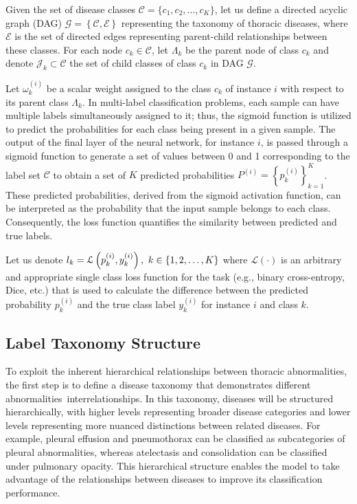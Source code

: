 Given the set of disease classes $\mathcal{C} = \{c_1,c_2,\dots,c_K\} $, let us define a directed acyclic graph (DAG) $\mathcal{G}=\left\{\mathcal{C},\mathcal{E}\right\} $ representing the taxonomy of thoracic diseases, where $\mathcal{E}$ is the set of directed edges representing parent-child relationships between these classes. For each node $c_k \in \mathcal{C} $, let $\Lambda_k$ be the parent node of class $c_k $ and denote $\mathcal{J}_k\subset \mathcal{C} $ the set of child classes of class $c_k $ in DAG $\mathcal{G}$.

Let $\omega_k^{(i)} $ be a scalar weight assigned to the class $c_k $ of instance $i $ with respect to its parent class $\Lambda_k$. In multi-label classification problems, each sample can have multiple labels simultaneously assigned to it; thus, the sigmoid function is utilized to predict the probabilities for each class being present in a given sample. The output of the final layer of the neural network, for instance $i $, is passed through a sigmoid function to generate a set of values between 0 and 1 corresponding to the label set $\mathcal{C} $ to obtain a set of $K $ predicted probabilities $P^{(i)}={\left\{p_k^{(i)}\right\}}_{k=1}^{K} $. These predicted probabilities, derived from the sigmoid activation function, can be interpreted as the probability that the input sample belongs to each class. Consequently, the loss function quantifies the similarity between predicted and true labels.

Let us denote $l_k = \mathcal{L} \left(p_k^{(i)},y_k^{(i)}\right),\hspace{0.33em}k \in \{1,2,\dots,K\} $ where $\mathcal{L}(\cdot) $ is an arbitrary and appropriate single class loss function for the task (e.g., binary cross-entropy, Dice, etc.) that is used to calculate the difference between the predicted probability $p_k^{(i)} $ and the true class label $y_k^{(i)} $ for instance $i$ and class $k $.


\subsection{Label Taxonomy Structure}\label{subsec:label-taxonomy-and-hierarchy}
To exploit the inherent hierarchical relationships between thoracic abnormalities, the first step is to define a disease taxonomy that demonstrates different abnormalities~interrelationships. In this taxonomy, diseases will be structured hierarchically, with higher levels representing broader disease categories and lower levels representing more nuanced distinctions between related diseases. For example, pleural effusion and pneumothorax can be classified as subcategories of pleural abnormalities, whereas atelectasis and consolidation can be classified under pulmonary opacity. This hierarchical structure enables the model to take advantage of the relationships between diseases to improve its classification performance.

